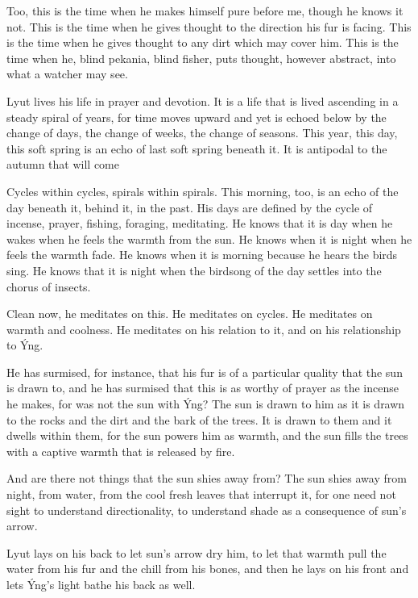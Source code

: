 Too, this is the time when he makes himself pure before me, though he knows it not. This is the time when he gives thought to the direction his fur is facing. This is the time when he gives thought to any dirt which may cover him. This is the time when he, blind pekania, blind fisher, puts thought, however abstract, into what a watcher may see.

\secdiv

\noindent Lyut lives his life in prayer and devotion. It is a life that is lived ascending in a steady spiral of years, for time moves upward and yet is echoed below by the change of days, the change of weeks, the change of seasons. This year, this day, this soft spring is an echo of last soft spring beneath it. It is antipodal to the autumn that will come

Cycles within cycles, spirals within spirals. This morning, too, is an echo of the day beneath it, behind it, in the past. His days are defined by the cycle of incense, prayer, fishing, foraging, meditating. He knows that it is day when he wakes when he feels the warmth from the sun. He knows when it is night when he feels the warmth fade. He knows when it is morning because he hears the birds sing. He knows that it is night when the birdsong of the day settles into the chorus of insects.

Clean now, he meditates on this. He meditates on cycles. He meditates on warmth and coolness. He meditates on his relation to it, and on his relationship to Ýng.

He has surmised, for instance, that his fur is of a particular quality that the sun is drawn to, and he has surmised that this is as worthy of prayer as the incense he makes, for was not the sun with Ýng? The sun is drawn to him as it is drawn to the rocks and the dirt and the bark of the trees. It is drawn to them and it dwells within them, for the sun powers him as warmth, and the sun fills the trees with a captive warmth that is released by fire.

And are there not things that the sun shies away from? The sun shies away from night, from water, from the cool fresh leaves that interrupt it, for one need not sight to understand directionality, to understand shade as a consequence of sun's arrow.

Lyut lays on his back to let sun's arrow dry him, to let that warmth pull the water from his fur and the chill from his bones, and then he lays on his front and lets Ýng's light bathe his back as well.

